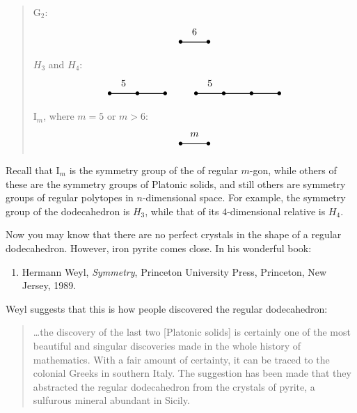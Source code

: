 \documentclass{article}
\def\tightlist{}
\begin{document}
\begin{quote}
\[\] \(\mathrm{G}_2\): \[
  \begin{tikzpicture}
    \draw[thick] (0,0) node{$\bullet$} to node[label=above:{6}]{} (1,0) node{$\bullet$};
  \end{tikzpicture}
\] \(H_3\) and \(H_4\): \[
  \begin{tikzpicture}
    \draw[thick] (0,0) node{$\bullet$} to node[label=above:{5}]{} (1,0) node{$\bullet$} to (2,0) node{$\bullet$};
  \end{tikzpicture}
  \qquad
  \begin{tikzpicture}
  \draw[thick] (0,0) node{$\bullet$} to node[label=above:{5}]{} (1,0) node{$\bullet$} to (2,0) node{$\bullet$} to (3,0) node {$\bullet$};
\end{tikzpicture}
\] \(\mathrm{I}_m\), where \(m = 5\) or \(m > 6\): \[
  \begin{tikzpicture}
    \draw[thick] (0,0) node{$\bullet$} to node[label=above:{$m$}]{} (1,0) node{$\bullet$};
  \end{tikzpicture}
\]
\end{quote}

Recall that \(\mathrm{I}_m\) is the symmetry group of the of regular
\(m\)-gon, while others of these are the symmetry groups of Platonic
solids, and still others are symmetry groups of regular polytopes in
\(n\)-dimensional space. For example, the symmetry group of the
dodecahedron is \(H_3\), while that of its \(4\)-dimensional relative is
\(H_4\).

Now you may know that there are no perfect crystals in the shape of a
regular dodecahedron. However, iron pyrite comes close. In his wonderful
book:

\begin{enumerate}
\def\labelenumi{\arabic{enumi})}
\tightlist
\item
  Hermann Weyl, \emph{Symmetry}, Princeton University Press, Princeton,
  New Jersey, 1989.
\end{enumerate}

Weyl suggests that this is how people discovered the regular
dodecahedron:

\begin{quote}
\ldots the discovery of the last two {[}Platonic solids{]} is certainly
one of the most beautiful and singular discoveries made in the whole
history of mathematics. With a fair amount of certainty, it can be
traced to the colonial Greeks in southern Italy. The suggestion has been
made that they abstracted the regular dodecahedron from the crystals of
pyrite, a sulfurous mineral abundant in Sicily.
\end{quote}
\end{document}
